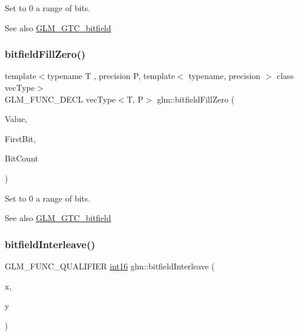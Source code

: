 Set to 0 a range of bits.

\begin{DoxySeeAlso}{See also}
\hyperlink{group__gtc__bitfield}{G\+L\+M\+\_\+\+G\+T\+C\+\_\+bitfield} 
\end{DoxySeeAlso}
\mbox{\label{group__gtc__bitfield_gaddba3196316b0bd240295b09b43c2958}} 
\subsubsection{\texorpdfstring{bitfield\+Fill\+Zero()}{bitfieldFillZero()}\hspace{0.1cm}{\footnotesize\ttfamily [2/2]}}
{\footnotesize\ttfamily template$<$typename T , precision P, template$<$ typename, precision $>$ class vec\+Type$>$ \\
G\+L\+M\+\_\+\+F\+U\+N\+C\+\_\+\+D\+E\+CL vec\+Type$<$T, P$>$ glm\+::bitfield\+Fill\+Zero (\begin{DoxyParamCaption}\item[{vec\+Type$<$ T, P $>$ const \&}]{Value,  }\item[{int}]{First\+Bit,  }\item[{int}]{Bit\+Count }\end{DoxyParamCaption})}

Set to 0 a range of bits.

\begin{DoxySeeAlso}{See also}
\hyperlink{group__gtc__bitfield}{G\+L\+M\+\_\+\+G\+T\+C\+\_\+bitfield} 
\end{DoxySeeAlso}
\mbox{\label{group__gtc__bitfield_ga479134317bc95d99f2b2e235d3db287b}} 
\subsubsection{\texorpdfstring{bitfield\+Interleave()}{bitfieldInterleave()}\hspace{0.1cm}{\footnotesize\ttfamily [1/16]}}
{\footnotesize\ttfamily G\+L\+M\+\_\+\+F\+U\+N\+C\+\_\+\+Q\+U\+A\+L\+I\+F\+I\+ER \hyperlink{group__gtc__type__precision_ga2945a61d12771f8954994fcddf02b021}{int16} glm\+::bitfield\+Interleave (\begin{DoxyParamCaption}\item[{\hyperlink{group__gtc__type__precision_ga96254f9c1c4506fc8eb5cf3301ce8565}{int8}}]{x,  }\item[{\hyperlink{group__gtc__type__precision_ga96254f9c1c4506fc8eb5cf3301ce8565}{int8}}]{y }\end{DoxyParamCaption})}

